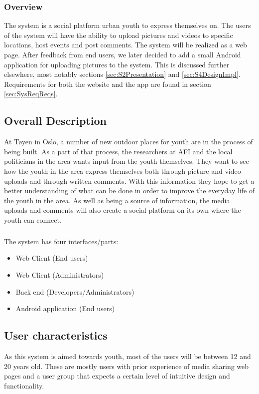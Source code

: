 \subsubsection*{Overview}
The system is a social platform urban youth to express themselves on. The users of the system will have the ability to upload pictures and videos to specific locations, host events and post comments. The system will be realized as a web page. After feedback from end users, we later decided to add a small Android application for uploading pictures to the system. This is discussed further elsewhere, most notably sections \ref{sec:S2Presentation} and \ref{sec:S4DesignImpl}. Requirements for both the website and the app are found in section \ref{sec:SysReqReqs}.

\subsection{Overall Description}
\label{subsec:SysReqIntroDescr}

At T\o yen in Oslo, a number of new outdoor places for youth are in the process of being built. As a part of that process, the researchers at AFI and the local politicians in the area wants input from the youth themselves. They want to see how the youth in the area express themselves both through picture and video uploads and through written comments. With this information they hope to get a better understanding of what can be done in order to improve the everyday life of the youth in the area. As well as being a source of information, the media uploads and comments will also create a social platform on its own where the youth can connect.
\subparagraph{} The system has four interfaces/parts:
\begin{itemize}
    \item Web Client (End users)
    \item Web Client (Administrators)
    \item Back end (Developers/Administrators)
    \item Android application (End users)
\end{itemize}

\subsection{User characteristics}
\label{subsec:SysReqIntroUserChar}

As this system is aimed towards youth, most of the users will be between 12 and 20 years old. These are mostly users with prior experience of media sharing web pages and a user group that expects a certain level of intuitive design and functionality.

